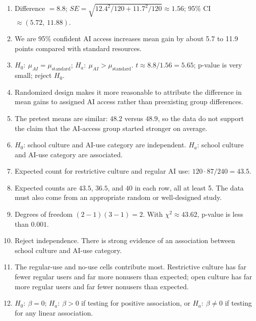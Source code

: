 \documentclass[11pt]{article}
\begin{document}
\begin{enumerate}[leftmargin=*]
\item Difference $= 8.8$;
$SE = \sqrt{12.4^2/120 + 11.7^2/120} \approx 1.56$;
95\% CI $\approx (5.72,\ 11.88)$.

\item We are 95\% confident AI access increases mean gain by about
5.7 to 11.9 points compared with standard resources.

\item $H_0\!:\ \mu_{AI} = \mu_{\text{standard}}$;
$H_a\!:\ \mu_{AI} > \mu_{\text{standard}}$.
$t \approx 8.8/1.56 = 5.65$; p-value is very small; reject $H_0$.

\item Randomized design makes it more reasonable to attribute the
difference in mean gains to assigned AI access rather than
preexisting group differences.

\item The pretest means are similar: $48.2$ versus $48.9$, so the
data do not support the claim that the AI-access group started
stronger on average.

\item $H_0$: school culture and AI-use category are independent.
$H_a$: school culture and AI-use category are associated.

\item Expected count for restrictive culture and regular AI use:
$120 \cdot 87 / 240 = 43.5$.

\item Expected counts are $43.5$, $36.5$, and $40$ in each row, all
at least 5. The data must also come from an appropriate random
or well-designed study.

\item Degrees of freedom $(2-1)(3-1) = 2$. With $\chi^2 \approx 43.62$,
p-value is less than $0.001$.

\item Reject independence. There is strong evidence of an association
between school culture and AI-use category.

\item The regular-use and no-use cells contribute most. Restrictive
culture has far fewer regular users and far more nonusers than
expected; open culture has far more regular users and far fewer
nonusers than expected.

\item $H_0\!:\ \beta = 0$; $H_a\!:\ \beta > 0$ if testing for
positive association, or $H_a\!:\ \beta \neq 0$ if testing for any
linear association.


\end{enumerate}
\end{document}
